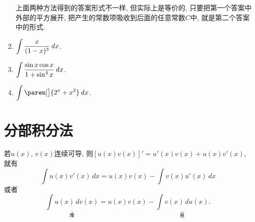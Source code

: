 \documentclass[a4paper,punct=CCT]{ctexbook}
\newcommand*{\mreason}[1]{#1}
\newcommand*{\disp}[1]{\( \displaystyle #1 \)}
\theoremstyle{break}
\newif\ifshowsol
\begin{document}
\begin{enumerate}
  上面两种方法得到的答案形式不一样, 但实际上是等价的, 只要把第一个答案中外部的平方展开, 把产生的常数项吸收到后面的任意常数\(C\)中, 就是第二个答案中的形式.
  \fi

\item \disp{\int \frac{x}{(1-x)^3} \dx}.

  \ifshowsol
  尝试使用\(u = 1/(1-x)^2\)和\(t = 1/(1-x)\)来做换元, 观察到
  \[
    \du = \frac{2}{(1-x)^3} \dx
    \quad \text{和} \quad
    \dt = \frac{1}{(1-x)^2} \dx,
  \]
  所以有
  \begin{align*}
    \int \frac{x}{(1-x)^3} \dx
    &= \int \paren[\bigg]{\frac{x-1}{(1-x)^3} + \frac{1}{(1-x)^3}} \dx \\
    &= - \int \frac{1}{(1-x)^2} \dx + \int \frac{1}{(1-x)^3} \dx \\
    &= - \int \dt + \frac12 \int \du \\
    &= - t + \frac u2 + C \\
    &= - \frac1{1-x} + \frac1{2 (1-x)^2} + C.
  \end{align*}
  \fi

\item \disp{\int \frac{\sin x \cos x}{1 + \sin^4 x} \dx}.

  \ifshowsol
  使用\(u = \sin x\)和\(t = u^2\)来做换元, 就有
  \begin{align*}
    \int \frac{\sin x \cos x}{1 + \sin^4 x} \dx
    &= \int \frac{u}{1+u^4} \du
    && \mreason{\du = \cos x \dx} \\
    &= \frac12 \int \frac1{1+t^2} \dt
    && \mreason{\dt = 2u \du} \\
    &= \frac12 \arctan t + C \\
    &= \frac12 \arctan \sin^2 x + C
    && \mreason{t = u^2,\ u = \sin x}
  \end{align*}
  \fi

\item \disp{\int \paren[\big]{2^x + x^2} \dx}.

  \ifshowsol
  \[
    \int \paren[\big]{2^x + x^2} \dx
    = \int 2^x \dx + \int x^2 \dx
    = \frac{2^x}{\ln 2} + \frac{x^3}3 + C.
  \]
  \fi
\end{enumerate}
\fi

\section{分部积分法}

若$u(x)$, $v(x)$连续可导, 则$[u(x) v(x)]' = u'(x)v(x) + u(x)v'(x)$, 就有
\[
  \int u(x) v'(x) \, dx = u(x) v(x) - \int v(x) u'(x) \, dx
\]
或者
\[
  \underset{\text{难}}{\underline{\int u(x) \, dv(x)}} =
  u(x) v(x) - \underset{\text{易}}{\underline{\int v(x) \, du(x)}}.
\]
\end{document}
